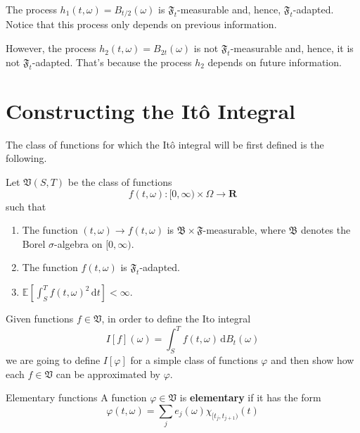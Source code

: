 \begin{example}
	The process $h_1(t, \omega) = B_{t/2}(\omega)$ is $\mathfrak{F}_t$-measurable and, hence, $\mathfrak{F}_t$-adapted. Notice that this process only depends on previous information.
	
	However, the process $h_2(t, \omega) = B_{2t}(\omega)$ is not $\mathfrak{F}_t$-measurable and, hence, it is not $\mathfrak{F}_t$-adapted. That's because the process $h_2$ depends on future information.
\end{example}

%
%

\section{Constructing the Itô Integral}

The class of functions for which the Itô integral will be first defined is the following.

\begin{definition}[]{}{}\label{def:ito-class}
	Let $\mathfrak{V}(S,T)$ be the class of functions
	\[
		f(t, \omega) : [0, \infty) \times \Omega \longrightarrow \textbf{R}
	\]
	such that
	\begin{enumerate}
		\item The function $(t, \omega) \longrightarrow f(t, \omega)$ is $\mathfrak{B} \times \mathfrak{F}$-measurable, where $\mathfrak{B}$ denotes the Borel $\sigma$-algebra on $[0, \infty)$.
		\item The function $f(t,\omega)$ is $\mathfrak{F}_t$-adapted.
		\item $\mathbb{E} \left[ \int_S^T f(t, \omega)^2 \, \mathrm{d}t \right] < \infty$.
	\end{enumerate}
\end{definition}

Given functions $f \in \mathfrak{V}$, in order to define the Ito integral
\[
	I[f](\omega) = \int_S^T f(t, \omega)\, \mathrm{d}B_t(\omega)
\]
we are going to define $I[\varphi]$ for a simple class of functions $\varphi$ and then show how each $f \in \mathfrak{V}$ can be approximated by $\varphi$.

\begin{definition}[]{Elementary functions}{}
	A function $\varphi \in \mathfrak{V}$ is \textbf{elementary} if it has the form
\[
	\varphi(t, \omega) = \sum_j e_j(\omega) \chi_{[t_j, t_{j+1})}(t)
\]
\end{definition}


